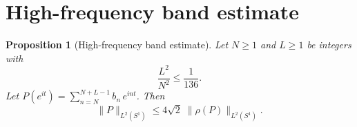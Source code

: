 \documentclass[11pt]{article}
\newtheorem{proposition}[theorem]{Proposition}
\newcommand{\rhof}{\rho}
\newcommand{\norm}[1]{\lVert #1\rVert}
\begin{document}
\section{High-frequency band estimate}\label{sec:highfreq}

\begin{proposition}[High-frequency band estimate]\label{prop:band}
Let $N \ge 1$ and $L \ge 1$ be integers with
\begin{equation}\label{eq:LN-cond}
  \frac{L^2}{N^2} \le \frac{1}{136}.
\end{equation}
Let $P(e^{it}) = \sum_{n=N}^{N+L-1}b_n\,e^{int}$.
Then
\begin{equation}\label{eq:band-bound}
  \norm{P}_{L^2(S^1)} \le 4\sqrt{2}\;\norm{\rhof(P)}_{L^2(S^1)}.
\end{equation}
\end{proposition}
\end{document}
